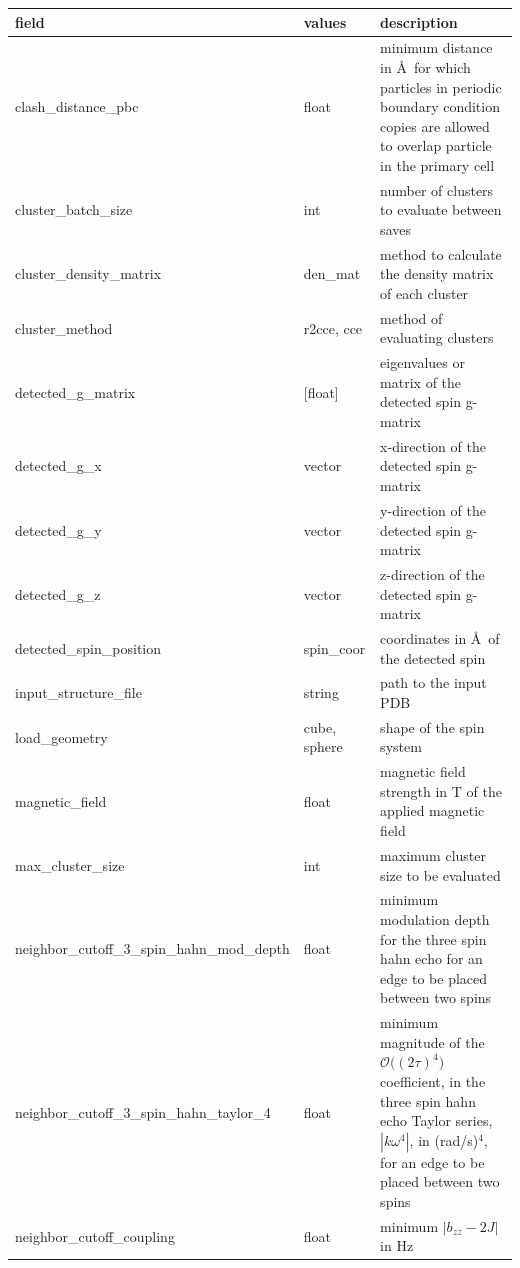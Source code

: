 \documentclass{book}
\begin{document}
\begin{center}
\begin{tabular}{| m{7cm} | m{2cm}| m{7cm} |}
 \hline 
 \textbf{field} & \textbf{values} & \textbf{description} \\ 
 \hline 
 clash\_distance\_pbc & float & 
 minimum distance in \AA~for which particles in periodic boundary condition 
 copies are allowed to overlap particle in the primary cell\\
 \hline 
 cluster\_batch\_size & int & number of clusters to evaluate between saves \\
 \hline 
 cluster\_density\_matrix & den\_mat & 
 method to calculate the density matrix of each cluster\\
 \hline 
 cluster\_method & r2cce, cce & method of evaluating clusters \\
 \hline 
 detected\_g\_matrix & [float] & eigenvalues or matrix of the detected spin g-matrix\\
 \hline 
 detected\_g\_x & vector & x-direction of the  detected spin g-matrix\\
 \hline 
 detected\_g\_y & vector & y-direction of the  detected spin g-matrix\\
 \hline 
 detected\_g\_z & vector & z-direction of the  detected spin g-matrix\\
 \hline 
 detected\_spin\_position & spin\_coor 
 & coordinates in \AA~of the detected spin\\
 \hline 
 input\_structure\_file & string & path to the input PDB \\
 \hline 
 load\_geometry & cube, sphere & shape of the spin system \\
 \hline 
 magnetic\_field & float & 
 magnetic field strength in T of the applied magnetic field\\
 \hline 
 max\_cluster\_size & int & maximum cluster size to be evaluated \\
 \hline 
 neighbor\_cutoff\_3\_spin\_hahn\_mod\_depth & float & 
 minimum modulation depth for the three spin hahn echo
 for an edge to be placed between two spins\\
 \hline 
 neighbor\_cutoff\_3\_spin\_hahn\_taylor\_4 & float & 
 minimum magnitude of the $\mathscr{O}\big((2\tau)^4\big)$ coefficient,
 in the three spin hahn echo Taylor series, $|k\omega^4|$,  in (rad/s)$^4$, 
 for an edge to be placed between two spins \\
 \hline 
 neighbor\_cutoff\_coupling & float & 
 minimum $|b_{zz}-2J|$ in Hz 

\end{tabular}
\end{center}
\end{document}
